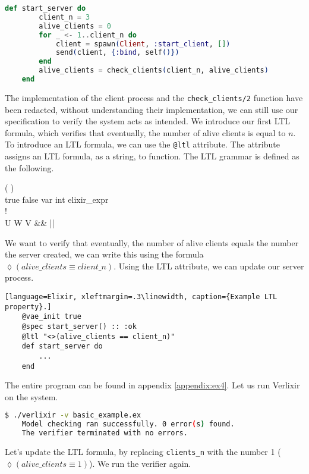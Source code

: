 \begin{lstlisting}[language=Elixir, xleftmargin=.2\linewidth]
    def start_server do
        client_n = 3
        alive_clients = 0
        for _ <- 1..client_n do
            client = spawn(Client, :start_client, [])
            send(client, {:bind, self()})
        end
        alive_clients = check_clients(client_n, alive_clients)
    end
\end{lstlisting}
The implementation of the client process and the \texttt{check\_clients/2} function have been redacted, without understanding their implementation, we can still use our specification to verify the system acts as intended. We introduce our first LTL formula, which verifies that eventually, the number of alive clients is equal to $n$. To introduce an LTL formula, we can use the \texttt{@ltl} attribute. The attribute assigns an LTL formula, as a string, to function. The LTL grammar is defined as the following.
\begin{bnf*}
      { \bnfor (  ) \bnfor {}   \bnfor {} }\\
      {true \bnfor false \bnfor var \bnfor int \bnfor elixir\_expr}\\
      {\square \bnfor \lozenge \bnfor !}\\
      {U \bnfor W \bnfor V \bnfor \&\& \bnfor || \bnfor \rightarrow \bnfor \leftrightarrow }\\
\end{bnf*}
We want to verify that eventually, the number of alive clients equals the number the server created, we can write this using the formula $\lozenge (alive\_clients \equiv client\_n)$. Using the LTL attribute, we can update our server process.
\begin{lstlisting}[language=Elixir, xleftmargin=.3\linewidth, caption={Example LTL property}.]
    @vae_init true
    @spec start_server() :: :ok
    @ltl "<>(alive_clients == client_n)"
    def start_server do
        ...
    end
\end{lstlisting}
The entire program can be found in appendix \ref{appendix:ex4}. Let us run Verlixir on the system.
\begin{lstlisting}[language=bash, xleftmargin=.3\linewidth]
    $ ./verlixir -v basic_example.ex
    Model checking ran successfully. 0 error(s) found.
    The verifier terminated with no errors.
\end{lstlisting}
Let's update the LTL formula, by replacing \texttt{clients\_n} with the number 1 ($\lozenge (alive\_clients \equiv 1)$). We run the verifier again.
